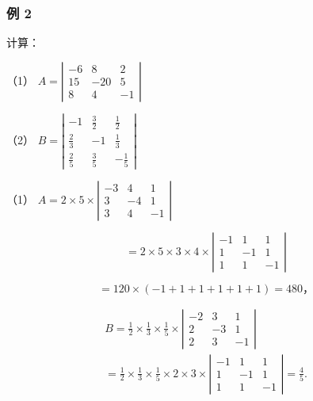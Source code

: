 \subsubsection{例 2}

计算：

（1）
\(A = \left| \begin{array}{ccc} - 6 & 8 & 2\\ 15 & -20 & 5\\ 8 & 4 & -1 \end{array} \right|\)

（2）
\(B = \left| \begin{array}{ccc} - 1 & \frac{3}{2} & \frac{1}{2}\\ \frac{2}{3} & -1 & \frac{1}{3}\\ \frac{2}{5} & \frac{3}{5} & -\frac{1}{5} \end{array} \right|\)

 （1）
\(A = 2 \times 5 \times \left| \begin{array}{ccc} -3 & 4 & 1 \\ 3 & -4 & 1 \\ 3 & 4 & -1 \end{array} \right|\)

\[
= 2 \times 5 \times 3 \times 4 \times \left| \begin{array}{ccc} - 1 & 1 & 1 \\ 1 & - 1 & 1 \\ 1 & 1 & - 1 \end{array} \right|
\]

\[
= 120 \times (- 1 + 1 + 1 + 1 + 1 + 1) = 480\text{，}
\]

\[
\begin{array}{l} B = \frac {1}{2} \times \frac {1}{3} \times \frac {1}{5} \times \left| \begin{array}{ccc} - 2 & 3 & 1 \\ 2 & - 3 & 1 \\ 2 & 3 & - 1 \end{array} \right| \tag {2} \\ = \frac {1}{2} \times \frac {1}{3} \times \frac {1}{5} \times 2 \times 3 \times \left| \begin{array}{ccc} - 1 & 1 & 1 \\ 1 & - 1 & 1 \\ 1 & 1 & - 1 \end{array} \right| = \frac {4}{5}. \\ \end{array}
\]

